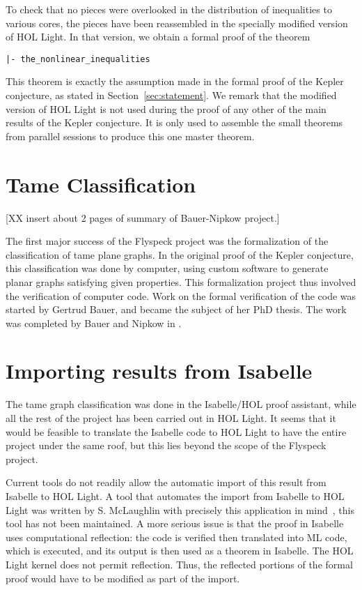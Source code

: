 To check that no pieces were overlooked in the distribution of
inequalities to various cores, the pieces have been reassembled in the
specially modified version of HOL Light.  In that version, we obtain
a formal proof of the theorem

\begin{verbatim}
|- the_nonlinear_inequalities
\end{verbatim}

This theorem is exactly the assumption made in the formal proof
of the Kepler conjecture, as stated in Section~\ref{sec:statement}.
We remark that the modified version of HOL Light is not used during
the proof of any other of the main results of the Kepler conjecture.
It is only used to assemble the small theorems from parallel sessions
to produce this one master theorem.

\section{Tame Classification}

[XX insert about 2 pages of summary of Bauer-Nipkow project.]

The first major success of the Flyspeck project was the formalization
of the classification of tame plane graphs.  In the original proof of
the Kepler conjecture, this classification was done by computer, using
custom software to generate planar graphs satisfying given
properties.  This formalization project thus involved the verification
of computer code.  Work on the formal verification of the code was
started by Gertrud Bauer, and became the subject of her PhD thesis.
The work was completed by Bauer and Nipkow in \cite{XX}.


\section{Importing results from Isabelle}


The tame graph classification was done in the Isabelle/HOL proof
assistant, while all the rest of the project has been carried out in
HOL Light.  It seems that it would be feasible to translate the
Isabelle code to HOL Light to have the entire project under the same
roof, but this lies beyond the scope of the Flyspeck project.

Current tools do not readily allow the automatic import of this result
from Isabelle to HOL Light.  A tool that automates the import from
Isabelle to HOL Light was written by S. McLaughlin with precisely this
application in mind~\cite{XX}, this tool has not been maintained.  A
more serious issue is that the proof in Isabelle uses computational
reflection: the code is verified then translated into ML code, which
is executed, and its output is then used as a theorem in Isabelle.
The HOL Light kernel does not permit reflection.  Thus, the reflected
portions of the formal proof would have to be modified as part of the
import.

